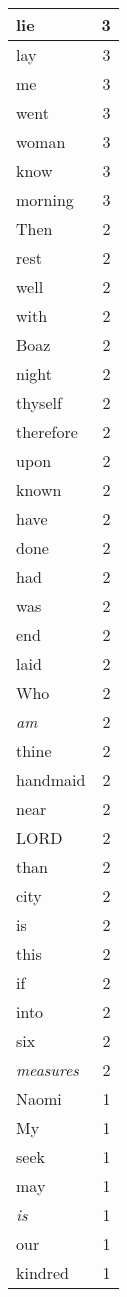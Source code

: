 \begin{center}
\begin{longtable}{l|r}
lie & 3 \\ \hline
lay & 3 \\ \hline
me & 3 \\ \hline
went & 3 \\ \hline
woman & 3 \\ \hline
know & 3 \\ \hline
morning & 3 \\ \hline
Then & 2 \\ \hline
rest & 2 \\ \hline
well & 2 \\ \hline
with & 2 \\ \hline
Boaz & 2 \\ \hline
night & 2 \\ \hline
thyself & 2 \\ \hline
therefore & 2 \\ \hline
upon & 2 \\ \hline
known & 2 \\ \hline
have & 2 \\ \hline
done & 2 \\ \hline
had & 2 \\ \hline
was & 2 \\ \hline
end & 2 \\ \hline
laid & 2 \\ \hline
Who & 2 \\ \hline
\emph{am} & 2 \\ \hline
thine & 2 \\ \hline
handmaid & 2 \\ \hline
near & 2 \\ \hline
LORD & 2 \\ \hline
than & 2 \\ \hline
city & 2 \\ \hline
is & 2 \\ \hline
this & 2 \\ \hline
if & 2 \\ \hline
into & 2 \\ \hline
six & 2 \\ \hline
\emph{measures} & 2 \\ \hline
Naomi & 1 \\ \hline
My & 1 \\ \hline
seek & 1 \\ \hline
may & 1 \\ \hline
\emph{is} & 1 \\ \hline
our & 1 \\ \hline
kindred & 1 \\ \hline

\end{longtable}
\end{center}
